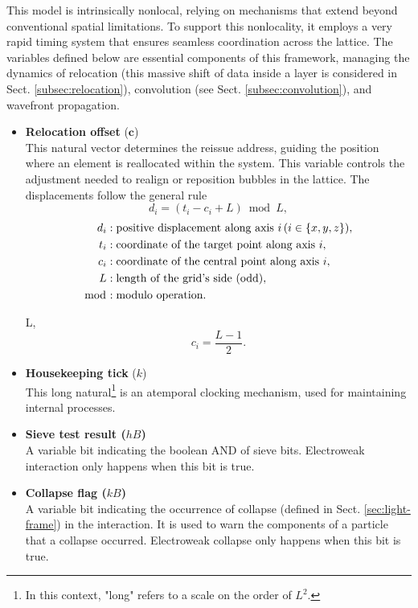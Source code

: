 \documentclass[12pt]{article}
\begin{document}
This model is intrinsically nonlocal, relying on mechanisms that extend beyond conventional spatial limitations. To support this nonlocality, it employs a very rapid timing system that ensures seamless coordination across the lattice. The variables defined below are essential components of this framework, managing the dynamics of relocation (this massive shift of data inside a layer is considered in Sect. \ref{subsec:relocation}), convolution (see Sect. \ref{subsec:convolution}), and wavefront propagation.
\begin{itemize}
    \item \textbf{Relocation offset} ($\textbf{c}$)\\
 This natural vector determines the reissue address, guiding the position where an element is reallocated within the system. This variable controls the adjustment needed to realign or reposition bubbles in the lattice. The displacements follow the general rule
 \[
d_i = (t_i - c_i + L) \bmod L,
\]
\begin{align*}
d_i & : \text{positive displacement along axis } i \, (i \in \{x, y, z\}), \\
t_i & : \text{coordinate of the target point along axis } i, \\
c_i & : \text{coordinate of the central point along axis } i, \\
L & : \text{length of the grid's side (odd)}, \\
\bmod & : \text{modulo operation}.
\end{align*}

 L, 
\[
c_i = \frac{L - 1}{2}.
\]

    \item \textbf{Housekeeping tick} ($k$)\\
 This long natural\footnote{In this context, "long" refers to a scale on the order of $L^2$.} is an atemporal clocking mechanism, used for maintaining internal processes.
 
   \item \textbf{Sieve test result ($hB$)} \\
    A variable bit indicating the boolean AND of sieve bits. Electroweak interaction only happens when this bit is true.
    
    \item \textbf{Collapse flag ($kB$)} \\
    A variable bit indicating the occurrence of collapse (defined in Sect. \ref{sec:light-frame}) in the interaction. It is used to warn the components of a particle that a collapse occurred. Electroweak collapse only happens when this bit is true.

\end{itemize}
\end{document}
